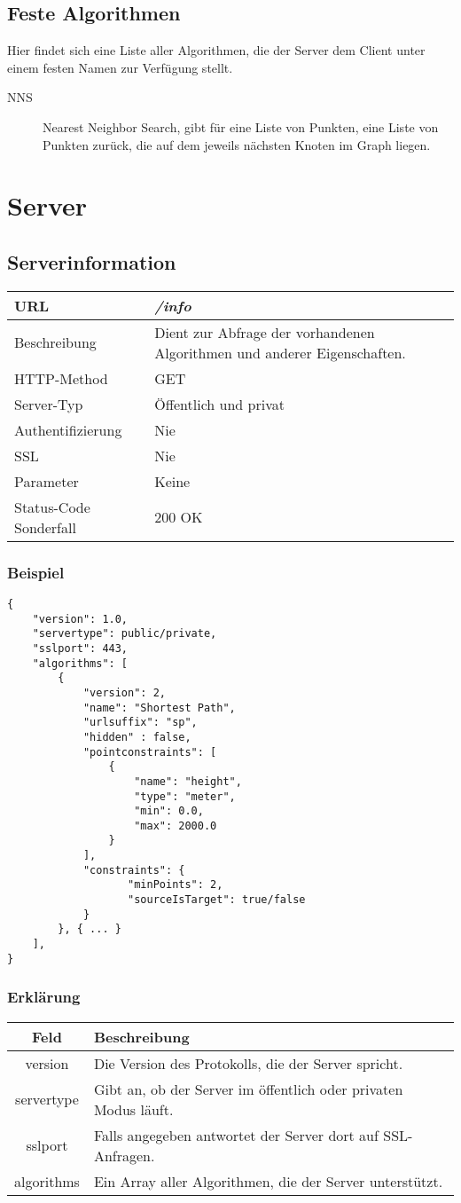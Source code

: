\documentclass[ngerman,titlepage,parskip=true]{scrartcl}
\newcommand{\requestURL}[1]{\textit{#1}}
\newcommand{\request}[9]
{\subsection{#1}
\begin{tabular}{|p{0.2\textwidth}|p{0.7\textwidth}|}
\hline
  URL & \requestURL{#2}\\\hline
    Beschreibung & #3\\\hline
  HTTP-Method & #4\\\hline
  Server-Typ & #5\\\hline
  Authentifizierung & #6\\\hline
  SSL & #7\\\hline
  Parameter & #8\\\hline
  Status-Code Sonderfall & #9\\\hline
 \end{tabular}\vspace*{1em}}
{}%
{}%
{}%
{}%
{}%
{}%
{}%
{}%
\begin{document}
\subsection{Feste Algorithmen} 
Hier findet sich eine Liste aller Algorithmen, die der Server dem Client unter einem festen Namen zur Verfügung stellt.

\begin{description}
\item[NNS] Nearest Neighbor Search, gibt für eine Liste von Punkten, eine Liste von Punkten zurück, die auf dem jeweils nächsten Knoten im Graph liegen.
\end{description}

\clearpage
\section{Server}

\request{Serverinformation}
{/info}
{Dient zur Abfrage der vorhandenen Algorithmen und anderer Eigenschaften.}
{GET}
{Öffentlich und privat}
{Nie}
{Nie}
{Keine}
{200 OK}
\subsubsection{Beispiel}
	
	\begin{lstlisting}
{
    "version": 1.0,
    "servertype": public/private,
    "sslport": 443,
    "algorithms": [
        {
            "version": 2,
            "name": "Shortest Path",
            "urlsuffix": "sp",
            "hidden" : false,
            "pointconstraints": [                    
                {
                    "name": "height",
                    "type": "meter",
                    "min": 0.0,
                    "max": 2000.0
                }
            ],
            "constraints": {
                   "minPoints": 2,
                   "sourceIsTarget": true/false 
            }
        }, { ... }
    ],
}
    \end{lstlisting}
    \subsubsection*{Erklärung}
    
    \begin{tabular}{|c|p{14cm}|}
    	\hline
    	\textbf{Feld} & \textbf{Beschreibung} \\ 
    	\hline \hline
    	
    	version & Die Version des Protokolls, die der Server spricht. \\ 
    	\hline
    	
    	servertype & Gibt an, ob der Server im öffentlich oder privaten Modus läuft. \\
    	\hline
    	sslport & Falls angegeben antwortet der Server dort auf SSL-Anfragen.\\
    	\hline
    	
    	algorithms & Ein Array aller Algorithmen, die der Server unterstützt. \\
    	\hline
    \end{tabular}
    
\end{document}
